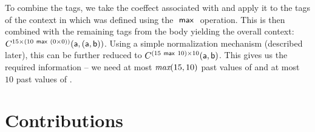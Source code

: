 To combine the tags, we take the coeffect associated with  and apply it to the tags
of the context in which  was defined using the $~\textnormal{\sffamily max}~$ operation. This is then combined 
with the remaining tags from the body yielding the overall context:
$C^{15 \times (10 ~\textnormal{\sffamily max}~ (0 \times 0))}(\textnormal{\sffamily a}, (\textnormal{\sffamily a}, \textnormal{\sffamily b}))$. Using a simple
normalization mechanism (described later), this can be further reduced to
$C^{(15 ~\textnormal{\sffamily max}~ 10) \times 10}(\textnormal{\sffamily a}, \textnormal{\sffamily b})$. This gives us the required information --
we need at most $\emph{max}(15,10)$ past values of  and at most $10$ past values of 
.


\section{Contributions}
